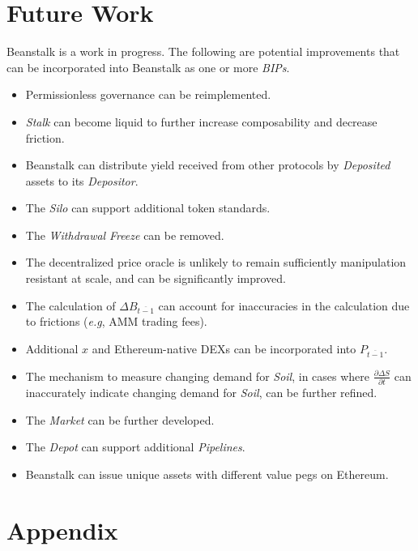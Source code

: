 \documentclass[tikz]{article}
\newcommand{\term}[1]{\textsl{#1}}
\begin{document}
\section{Future Work}
Beanstalk is a work in progress. The following are potential improvements that can be incorporated into Beanstalk as one or more \term{BIPs}.

\newpage
\begin{itemize}
    \item Permissionless governance can be reimplemented.
    \item \term{Stalk} can become liquid to further increase composability and decrease friction. 
    \item Beanstalk can distribute yield received from other protocols by \term{Deposited} assets to its \term{Depositor}.
    \item The \term{Silo} can support additional token standards.
    \item The \term{Withdrawal} \term{Freeze} can be removed.
    \item The decentralized price oracle is unlikely to remain sufficiently manipulation resistant at scale, and can be significantly improved. 
    \item The calculation of $\Delta B_{\overline{t-1}}$ can account for inaccuracies in the calculation due to frictions (\term{e.g}, AMM trading fees).
    \item Additional $x$ and Ethereum-native DEXs can be incorporated into $P_{\overline{t-1}}$.
    \item The mechanism to measure changing demand for \term{Soil}, in cases where $\frac{\partial \Delta S}{\partial t}$ can inaccurately indicate changing demand for \term{Soil}, can be further refined.
    \item The \term{Market} can be further developed.
    \item The \term{Depot} can support additional \term{Pipelines}.
    \item Beanstalk can issue unique assets with different value pegs on Ethereum.
\end{itemize}

\newpage
\section{Appendix}

\newpage
\end{document}
